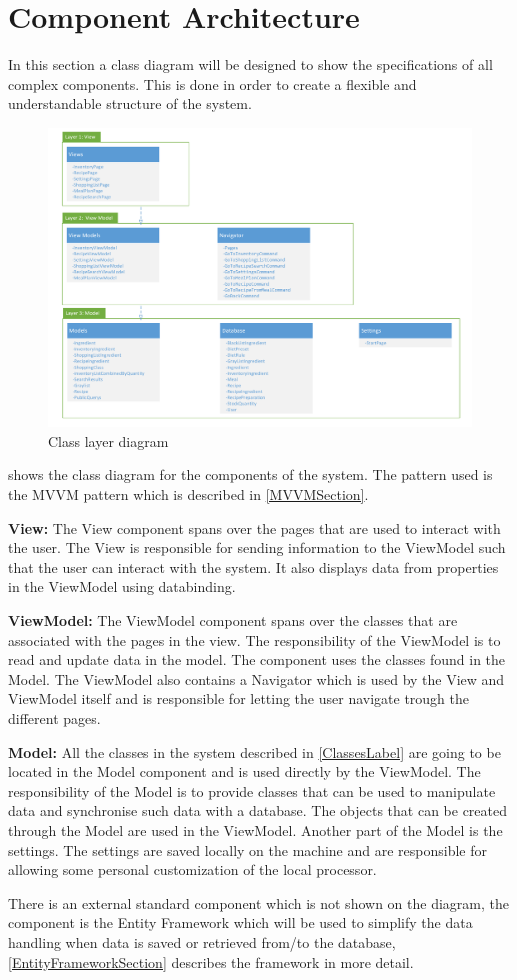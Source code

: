 \section{Component Architecture} \label{ComponentArchitecture}
In this section a class diagram will be designed to show the specifications of all complex components. This is done in order to create a flexible and understandable structure of the system.

\begin{figure}[H]
\includegraphics[width=\linewidth]{Grafik/FoodPlanner/ComponentDiagram}
\centering
\caption{Class layer diagram}
\label{LayerDiagram}
\end{figure}

 shows the class diagram for the components of the system. The pattern used is the MVVM pattern which is described in \cref{MVVMSection}.

\textbf{View:}
The View component spans over the pages that are used to interact with the user. The View is responsible for sending information to the ViewModel such that the user can interact with the system. It also displays data from properties in the ViewModel using databinding.

\textbf{ViewModel:}
The ViewModel component spans over the classes that are associated with the pages in the view. The responsibility of the ViewModel is to read and update data in the model. The component uses the classes found in the Model. The ViewModel also contains a Navigator which is used by the View and ViewModel itself and is responsible for letting the user navigate trough the different pages.

\textbf{Model:}
All the classes in the system described in \cref{ClassesLabel} are going to be located in the Model component and is used directly by the ViewModel. The responsibility of the Model is to provide classes that can be used to manipulate data and synchronise such data with a database. The objects that can be created through the Model are used in the ViewModel. Another part of the Model is the settings. The settings are saved locally on the machine and are responsible for allowing some personal customization of the local processor.

There is an external standard component which is not shown on the diagram, the component is the Entity Framework which will be used to simplify the data handling when data is saved or retrieved from/to the database, \cref{EntityFrameworkSection} describes the framework in more detail.